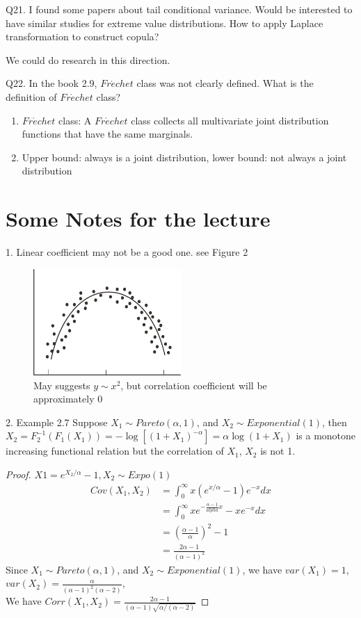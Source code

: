 \documentclass[a4paper,12pt]{texMemo}
\begin{document}
Q21. I found some papers about tail conditional variance. Would be interested to have similar studies for extreme value distributions. How to apply Laplace transformation to construct copula?

We could do research in this direction.

Q22. In the book 2.9, $Fr\acute{e}chet$ class was not clearly defined. What is the definition of $Fr\acute{e}chet$ class?

\begin{enumerate}
\item $Fr\acute{e}chet$ class: A $Fr\acute{e}chet$ class collects all multivariate joint distribution functions that have the same marginals.
\item Upper bound: always is a joint distribution, lower bound: not always a joint distribution
\end{enumerate}

\section{Some Notes for the lecture}
1. Linear coefficient may not be a good one. see Figure 2
\begin{figure}
\centering
\includegraphics[width = 0.5\textwidth]{nonlinear.png}
\caption{\label{fig: non-linear correlation}May suggests $y \sim x^2$, but correlation coefficient will be approximately 0}
\end{figure}

2. Example 2.7 Suppose $X_1 \sim Pareto(\alpha, 1)$, and $X_2 \sim Exponential(1)$, then $X_2 = F_2^{-1}(F_1(X_1)) = -\log[(1+X_1)^{-\alpha}] = \alpha \log(1+X_1)$ is a monotone increasing functional relation but the correlation of $X_1$, $X_2$ is not 1.
\begin{proof}
$X1 = e^{X_2/\alpha} - 1, X_2 \sim Expo(1)$
\begin{align*}
Cov(X_1, X_2)
& = \int_0^{\infty} x(e^{x/\alpha} - 1) e^{-x} dx\\
& = \int_0^{\infty} x e^{-\frac{\alpha - 1}{alpha}x} - x e^{-x} dx\\
& = (\frac{\alpha - 1}{\alpha})^2 - 1 \\
& = \frac{2\alpha - 1}{(\alpha - 1)^2}
\end{align*}
Since $X_1 \sim Pareto(\alpha, 1)$, and $X_2 \sim Exponential(1)$, we have $var(X_1) = 1$, $var(X_2) = \frac{\alpha}{(\alpha - 1)^2 (\alpha - 2)}$,\\
We have $Corr(X_1, X_2) = \frac{2\alpha - 1}{(\alpha - 1)\sqrt{\alpha/(\alpha - 2)}}$
\end{proof}


\end{document}
